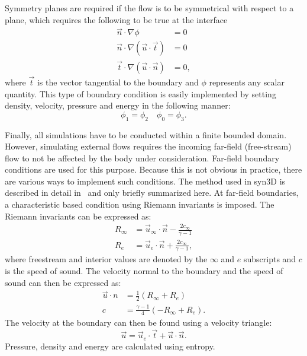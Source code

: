 Symmetry planes are required if the flow is to be symmetrical with respect to a plane, which requires the following to be true at the interface
\begin{align*}
    \vec{n}\cdot\nabla\phi &= 0 \\
    \vec{n}\cdot\nabla(\vec{u}\cdot\vec{t}) &= 0\\
    \vec{t}\cdot\nabla(\vec{u}\cdot\vec{n}) &= 0,
\end{align*}
where $\vec{t}$ is the vector tangential to the boundary and $\phi$ represents any scalar quantity. This type of boundary condition is easily implemented by setting density, velocity, pressure and energy in the following manner:
\begin{equation*}
    \phi_1 = \phi_2 \quad \phi_0 = \phi_3.
\end{equation*}

Finally, all simulations have to be conducted within a finite bounded domain. However, simulating external flows requires the incoming far-field (free-stream) flow to not be affected by the body under consideration. Far-field boundary conditions are used for this purpose. Because this is not obvious in practice, there are various ways to implement such conditions. The method used in syn3D is described in detail in~\cite{jameson1983solution} and only briefly summarized here. At far-field boundaries, a characteristic based condition using Riemann invariants is imposed. The Riemann invariants can be expressed as:
\begin{align*}
    R_\infty &= \vec{u}_\infty\cdot\vec{n} - \frac{2 c_\infty}{\gamma - 1} \\ 
    R_e &= \vec{u}_e\cdot\vec{n} + \frac{2 c_\infty}{\gamma - 1},
\end{align*}
where freestream and interior values are denoted by the $\infty$ and $e$ subscripts and $c$ is the speed of sound. The velocity normal to the boundary and the speed of sound can then be expressed as:
\begin{align*}
    \vec{u}\cdot{n} &= \frac{1}{2}(R_\infty + R_e) \\
    c &= \frac{\gamma - 1}{4}(-R_\infty + R_e).
\end{align*}
The velocity at the boundary can then be found using a velocity triangle:
\begin{equation*}
    \vec{u} = \vec{u}_e\cdot\vec{t} + \vec{u}\cdot\vec{n}.
\end{equation*}
Pressure, density and energy are calculated using entropy.
%
%
